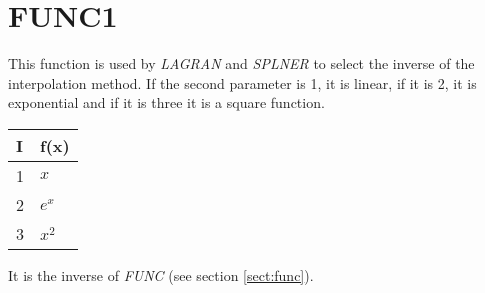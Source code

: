 \section{FUNC1}
\label{sect:func1}

\noindent This function is used by {\em LAGRAN} and {\em SPLNER} to select
the inverse of the interpolation method. If the second parameter is 1, it is
linear, if it is 2, it is exponential and if it is three it is a square
function.\\

\begin{center}
\begin{tabular}{|ll|}
\hline
I & f(x)\\
\hline
1 & $x$\\
2 & $e^x$\\
3 & $x^2$\\
\hline
\end{tabular}
\end{center}

\noindent It is the inverse of {\em FUNC} (see section \ref{sect:func}).\\
